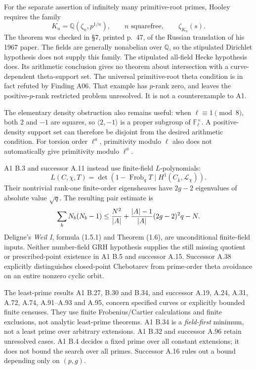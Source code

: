For the separate assertion of infinitely many primitive-root primes,
Hooley requires the family
\[
 K_n=\mathbb Q(\zeta_n,p^{1/n}),\qquad n\text{ squarefree},
 \qquad \zeta_{K_n}(s).
\]
The theorem was checked in \S7, printed p.~47, of the Russian
translation of his 1967 paper. The fields are generally nonabelian
over $\mathbb Q$, so the stipulated Dirichlet hypothesis does not
supply this family. The stipulated all-field Hecke hypothesis does.
Its arithmetic conclusion gives no theorem about intersection with a
curve-dependent theta-support set. The universal primitive-root theta
condition is in fact refuted by Finding A06. That example has
$p$-rank zero, and leaves the positive-$p$-rank restricted problem
unresolved. It is not a counterexample to A1.

The elementary density obstruction also remains useful: when
$\ell\equiv1\pmod8$, both $2$ and $-1$ are squares, so
$\langle2,-1\rangle$ is a proper subgroup of
$\mathbb F_\ell^\times$. A positive-density support set can therefore
be disjoint from the desired arithmetic condition. For torsion order
$\ell^a$, primitivity modulo $\ell$ also does not automatically
give primitivity modulo $\ell^a$.

A1 B.3 and successor A.11 instead use finite-field $L$-polynomials:
\[
 L(C,\chi,T)=\det(1-\operatorname{Frob}_qT
                  \mid H^1(C_{\bar k},\mathcal L_\chi)).
\]
Their nontrivial rank-one finite-order eigensheaves have $2g-2$
eigenvalues of absolute value $\sqrt q$. The resulting pair estimate is
\[
 \sum_bN_b(N_b-1)
 \le {N^2\over|A|}
   +{|A|-1\over|A|}(2g-2)^2q-N.
\]
Deligne's \emph{Weil I}, formula (1.5.1) and Theorem (1.6), are
unconditional finite-field inputs. Neither number-field GRH hypothesis
supplies the still missing quotient or prescribed-point existence in
A1 B.5 and successor A.15. Successor A.38 explicitly distinguishes
closed-point Chebotarev from prime-order theta avoidance on an entire
nonzero cyclic orbit.

The least-prime results A1 B.27, B.30 and B.34, and successor
A.19, A.24, A.31, A.72, A.74, A.91--A.93 and A.95, concern specified
curves or explicitly bounded finite censuses. They use finite
Frobenius/Cartier calculations and finite exclusions, not analytic
least-prime theorems. A1 B.34 is a \emph{field-first} minimum, not a
least prime over arbitrary extensions. A1 B.32 and successor A.96
retain unresolved cases. A1 B.4 decides a fixed prime over all
constant extensions; it does not bound the search over all primes.
Successor A.16 rules out a bound depending only on $(p,g)$.

